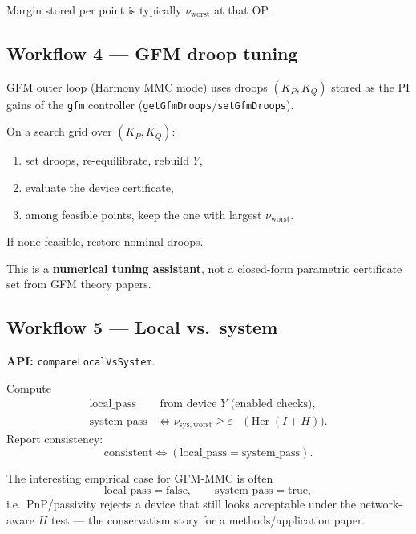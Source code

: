 \documentclass[11pt,a4paper]{article}
\theoremstyle{definition}
\begin{document}
Margin stored per point is typically $\nu_{\mathrm{worst}}$ at that OP.

\subsection{Workflow 4 --- GFM droop tuning}

GFM outer loop (Harmony MMC mode) uses droops $(K_P,K_Q)$ stored as the PI
gains of the \texttt{gfm} controller
(\texttt{getGfmDroops}/\texttt{setGfmDroops}).

On a search grid over $(K_P,K_Q)$:
\begin{enumerate}[leftmargin=*]
  \item set droops, re-equilibrate, rebuild $Y$,
  \item evaluate the device certificate,
  \item among feasible points, keep the one with largest $\nu_{\mathrm{worst}}$.
\end{enumerate}
If none feasible, restore nominal droops.

This is a \textbf{numerical tuning assistant}, not a closed-form parametric
certificate set from GFM theory papers.

\subsection{Workflow 5 --- Local vs.\ system}

\textbf{API:} \texttt{compareLocalVsSystem}.

Compute
\begin{align}
  \mathrm{local\_pass}
  &\text{ from device }Y\text{ (enabled checks)},\\
  \mathrm{system\_pass}
  &\iff \nu_{\mathrm{sys,worst}}\ge\varepsilon
  \quad\bigl(\operatorname{Her}(I+H)\bigr).
\end{align}
Report consistency:
\begin{equation}
  \mathrm{consistent}
  \iff
  (\mathrm{local\_pass}=\mathrm{system\_pass}).
\end{equation}

The interesting empirical case for GFM-MMC is often
\begin{equation}
  \mathrm{local\_pass}=\mathrm{false},
  \qquad
  \mathrm{system\_pass}=\mathrm{true},
\end{equation}
i.e.\ PnP/passivity rejects a device that still looks acceptable under the
network-aware $H$ test --- the conservatism story for a methods/application
paper.
\end{document}
